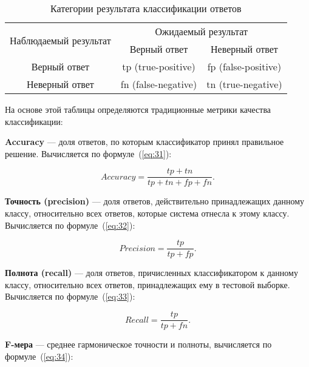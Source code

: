 \begin{table}[!h]
	\begin{center}
		\begin{threeparttable}
			\captionsetup{justification=raggedright,singlelinecheck=off}
			\caption{\label{tb:s4}Категории результата классификации ответов}
			\begin{tabular}{|c|c|c|}
				\hline
				\multirow{2}{*}{Наблюдаемый результат}&\multicolumn{2}{|c|}{Ожидаемый результат}\\
				{} & Верный ответ & Неверный ответ\\
				\hline
				Верный ответ & tp (true-positive) & fp (false-positive)\\ 
				\hline
				Неверный ответ & fn (false-negative) & tn (true-negative)\\
				\hline
			\end{tabular}
		\end{threeparttable} 
	\end{center}
\end{table}

На основе этой таблицы определяются традиционные метрики качества классификации:

\textbf{Accuracy} --- доля ответов, по которым классификатор принял правильное решение. Вычисляется по формуле~(\ref{eq:31}):

\begin{equation}\label{eq:31}
	Accuracy = \frac{tp + tn}{tp + tn + fp + fn}.
\end{equation}

\textbf{Точность (precision)} --- доля ответов, действительно принадлежащих данному классу, относительно всех ответов, которые система отнесла к этому классу. Вычисляется по формуле~(\ref{eq:32}):

\begin{equation}\label{eq:32}
	Precision = \frac{tp}{tp + fp}.
\end{equation}

\textbf{Полнота (recall)} --- доля ответов, причисленных классификатором к данному классу, относительно всех ответов, принадлежащих ему в тестовой выборке. Вычисляется по формуле~(\ref{eq:33}):

\begin{equation}\label{eq:33}
	Recall = \frac{tp}{tp + fn}.
\end{equation}

\textbf{F-мера} --- среднее гармоническое точности и полноты, вычисляется по формуле~(\ref{eq:34}):

